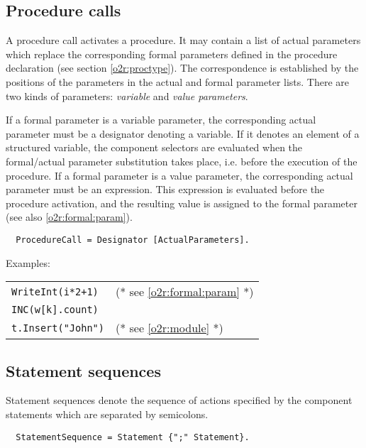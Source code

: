 \subsection{Procedure calls}

A procedure call activates a procedure. It may contain a list of actual
parameters which replace the corresponding formal parameters defined
in the procedure declaration (see section \ref{o2r:proctype}).
The correspondence is established by the positions of the parameters
in the actual and formal parameter lists. There are two kinds of parameters:
{\em variable} and {\em value parameters}.

        If a formal parameter is a variable parameter, the corresponding
actual parameter must be a designator denoting a variable. If it denotes
an element of a structured variable, the component selectors are evaluated
when the formal/actual parameter substitution takes place, i.e. before
the execution of the procedure. If a formal parameter is a value parameter,
the corresponding actual parameter must be an expression. This expression
is evaluated before the procedure activation, and the resulting value
is assigned to the formal parameter (see also \ref{o2r:formal:param}).
{\BNFsize
\begin{verbatim}
  ProcedureCall = Designator [ActualParameters].
\end{verbatim}}

\noindent
Examples:
\begin{flushleft}
\begin{tabular}{ll}
\verb|WriteInt(i*2+1)|          & (* see \ref{o2r:formal:param} *) \\
\verb|INC(w[k].count)|                                         \\
\verb|t.Insert("John")|         & (* see \ref{o2r:module} *)   \\
\end{tabular}
\end{flushleft}

\subsection{Statement sequences}

Statement sequences denote the sequence of actions specified by the
component statements which are separated by semicolons.
{\BNFsize
\begin{verbatim}
  StatementSequence = Statement {";" Statement}.
\end{verbatim}}

